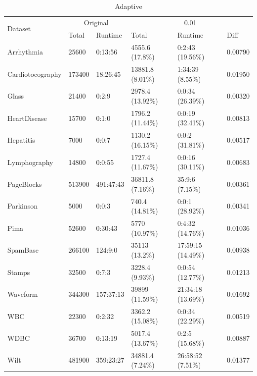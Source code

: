 \documentclass[11pt]{article}
\begin{document}
{\begin{table}[h!]
\centering
\footnotesize
\caption{Adaptive}
\label{tab:adaptive}
\begin{tabular}{|l|ll|lll|}
\hline
\multirow{2}{*}{Dataset} & \multicolumn{2}{c|}{Original} & \multicolumn{3}{c|}{0.01} \\ \cline{2-6} 
                                   & Total        & Runtime     & Total  & Runtime  & Diff   \\ \hline
Arrhythmia & 25600 & 0:13:56 & 4555.6 (17.8\%) & 0:2:43 (19.56\%)  &  0.00790  \\ 
Cardiotocography & 173400 & 18:26:45 & 13881.8 (8.01\%) & 1:34:39 (8.55\%)  &  0.01950  \\ 
Glass & 21400 & 0:2:9 & 2978.4 (13.92\%) & 0:0:34 (26.39\%)  &  0.00320  \\ 
HeartDisease & 15700 & 0:1:0 & 1796.2 (11.44\%) & 0:0:19 (32.41\%)  &  0.00813  \\ 
Hepatitis & 7000 & 0:0:7 & 1130.2 (16.15\%) & 0:0:2 (31.81\%)  &  0.00517  \\ 
Lymphography & 14800 & 0:0:55 & 1727.4 (11.67\%) & 0:0:16 (30.11\%)  &  0.00683  \\ 
PageBlocks & 513900 & 491:47:43 & 36811.8 (7.16\%) & 35:9:6 (7.15\%)  &  0.00361  \\ 
Parkinson & 5000 & 0:0:3 & 740.4 (14.81\%) & 0:0:1 (28.92\%)  &  0.00341  \\ 
Pima & 52600 & 0:30:43 & 5770 (10.97\%) & 0:4:32 (14.76\%)  &  0.01036  \\ 
SpamBase & 266100 & 124:9:0 & 35113 (13.2\%) & 17:59:15 (14.49\%)  &  0.00938  \\ 
Stamps & 32500 & 0:7:3 & 3228.4 (9.93\%) & 0:0:54 (12.77\%)  &  0.01213  \\ 
Waveform & 344300 & 157:37:13 & 39899 (11.59\%) & 21:34:18 (13.69\%)  &  0.01692  \\ 
WBC & 22300 & 0:2:32 & 3362.2 (15.08\%) & 0:0:34 (22.29\%)  &  0.00519  \\ 
WDBC & 36700 & 0:13:19 & 5017.4 (13.67\%) & 0:2:5 (15.68\%)  &  0.00887  \\ 
Wilt & 481900 & 359:23:27 & 34881.4 (7.24\%) & 26:58:52 (7.51\%)  &  0.01377  \\ 
 \hline
\end{tabular}
\end{table}

}
\end{document}
